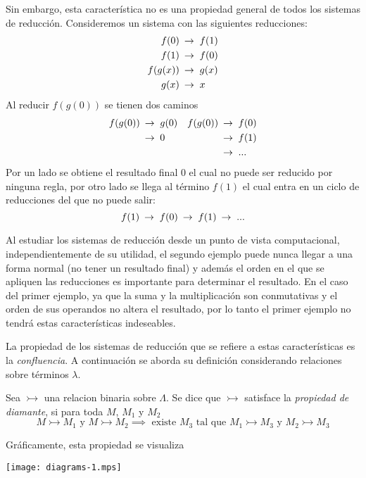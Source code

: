 Sin embargo, esta característica no es una propiedad general de todos los sistemas de reducción. Consideremos un sistema con las siguientes reducciones:
\begin{align*}
  f(0) &\ \operatorname{\rightarrow_{}}\  f(1) \\
  f(1) &\ \operatorname{\rightarrow_{}}\  f(0) \\
  f(g(x)) &\ \operatorname{\rightarrow_{}}\  g(x) \\
  g(x) &\ \operatorname{\rightarrow_{}}\  x
\end{align*}
Al reducir \( f(g(0)) \) se tienen dos caminos
\begin{align*}
  f(g(0)) &\ \operatorname{\rightarrow_{}}\  g(0) & f(g(0)) &\ \operatorname{\rightarrow_{}}\  f(0) \\
          &\ \operatorname{\rightarrow_{}}\  0    &         &\ \operatorname{\rightarrow_{}}\  f(1) \\
  & & &\ \operatorname{\rightarrow_{}}\  ...
\end{align*}
Por un lado se obtiene el resultado final \( 0 \) el cual no puede ser reducido por ninguna regla, por otro lado se llega al término \( f(1) \) el cual entra en un ciclo de reducciones del que no puede salir:
\[ f(1) \ \operatorname{\rightarrow_{}}\  f(0) \ \operatorname{\rightarrow_{}}\  f(1) \ \operatorname{\rightarrow_{}}\  ... \]

Al estudiar los sistemas de reducción desde un punto de vista computacional, independientemente de su utilidad, el segundo ejemplo puede nunca llegar a una forma normal (no tener un resultado final) y además el orden en el que se apliquen las reducciones es importante para determinar el resultado. En el caso del primer ejemplo, ya que la suma y la multiplicación son conmutativas y el orden de sus operandos no altera el resultado, por lo tanto el primer ejemplo no tendrá estas características indeseables.

La propiedad de los sistemas de reducción que se refiere a estas características es la \emph{confluencia}. A continuación se aborda su definición considerando relaciones sobre términos \( λ \).

\begin{defn}
  Sea \( \rightarrowtail \) una relacion binaria sobre \( Λ \). Se dice que \( \rightarrowtail \) satisface la \emph{propiedad de diamante}, si para toda \( M \), \( M_{1} \) y \( M_{2} \)
  \[ M \rightarrowtail M_{1} \text{ y } M \rightarrowtail M_{2} \implies \text{ existe } M_{3} \text{ tal que } M_{1} \rightarrowtail M_{3} \text{ y } M_{2} \rightarrowtail M_{3} \]

  Gráficamente, esta propiedad se visualiza
  \begin{center}
    \texttt{[image: diagrams-1.mps]}
  \end{center}
\end{defn}

